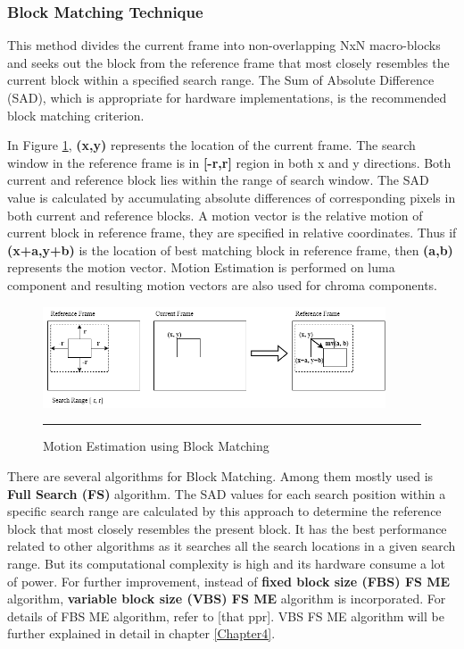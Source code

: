 \subsubsection{Block Matching Technique}
This method divides the current frame into non-overlapping NxN macro-blocks and seeks out the block from the reference frame that most closely resembles the current block within a specified search range. The Sum of Absolute Difference (SAD), which is appropriate for hardware implementations, is the recommended block matching criterion.

In Figure \ref{fig:mv}, \textbf{(x,y)} represents the location of the current frame. The search window in the reference frame is in \textbf{[-r,r]} region in both x and y directions. Both current and reference block lies within the range of search window. The SAD value is calculated by accumulating absolute differences of corresponding pixels in both current and reference blocks. A motion vector is the relative motion of current block in reference frame, they are specified in relative coordinates. Thus if \textbf{(x+a,y+b)} is the location of best matching block in reference frame, then \textbf{(a,b)} represents the motion vector. Motion Estimation is performed on luma component and resulting motion vectors are also used for chroma components.

\begin{figure}[H]
	\centering
	\includegraphics[width = 4in]{./Figures/mv.png}
	\rule{35em}{0.5pt}
	\caption{Motion Estimation using Block Matching}
	\label{fig:mv}
\end{figure}

There are several algorithms for Block Matching. Among them mostly used is \textbf{Full Search (FS)} algorithm. The SAD values for each search position within a specific search range are calculated by this approach to determine the reference block that most closely resembles the present block. It has the best performance related to other algorithms as it searches all the search locations in a given search range. But its computational complexity is high and its hardware consume a lot of power. For further improvement, instead of \textbf{fixed block size (FBS) FS ME} algorithm, \textbf{variable block size (VBS) FS ME} algorithm is incorporated. For details of FBS ME algorithm, refer to [that ppr]. VBS FS ME algorithm will be further explained in detail in chapter \ref{Chapter4}.


